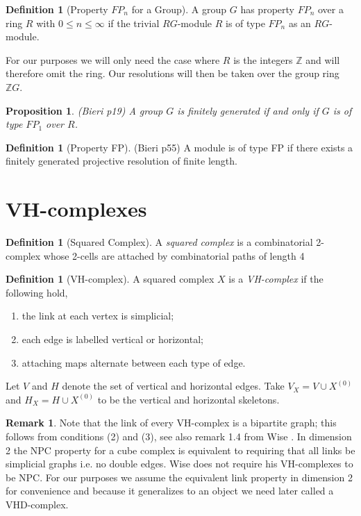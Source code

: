 \documentclass[12pt,parskip=full]{report}
\theoremstyle{plain}
\newtheorem{prop}[thm]{Proposition}
\theoremstyle{definition}
\newtheorem{rmk}[thm]{Remark}
\newtheorem{dfn}[thm]{Definition}
\begin{document}
\begin{dfn}
[Property \(FP_n\) for a Group]

A group \(G\) has property \(FP_n\) over a ring \(R\) with \(0\leq n\leq \infty\) if the trivial \(RG\)-module \(R\) is of type \(FP_n\) as an \(RG\)-module.
\end{dfn}

For our purposes we will only need the case where \(R\) is the integers \(\mathbb{Z}\) and will therefore omit the ring. Our resolutions will then be taken over the group ring \(\mathbb{Z}G\).

\begin{prop}
(Bieri p19)
A group \(G\) is finitely generated if and only if \(G\) is of type \(FP_1\) over \(R\).
\end{prop}

\begin{dfn}
[Property FP]
(Bieri p55)
A module is of type FP if there exists a finitely generated projective resolution of finite length.
\end{dfn}

\section{VH-complexes}

\begin{dfn}
    [Squared Complex]
    A \emph{squared complex} is a combinatorial 2-complex whose 2-cells are attached by combinatorial paths of length 4
\end{dfn}

\begin{dfn}
    [VH-complex]
    A squared complex $X$ is a \emph{VH-complex} if the following hold,
    \begin{enumerate}
        \item the link at each vertex is simplicial;
        \item each edge is labelled vertical or horizontal;
        \item attaching maps alternate between each type of edge.
    \end{enumerate}
    Let $V$ and $H$ denote the set of vertical and horizontal edges. Take $V_X = V \cup X^{(0)}$ and $H_X = H \cup X^{(0)}$ to be the vertical and horizontal skeletons. 
\end{dfn}

\begin{rmk}
Note that the link of every VH-complex is a bipartite graph; this follows from conditions (2) and (3), see also remark 1.4 from Wise \cite{wisethesis}. In dimension 2 the NPC property for a cube complex is equivalent to requiring that all links be simplicial graphs i.e. no double edges. Wise does not require his VH-complexes to be NPC. For our purposes we assume the equivalent link property in dimension 2 for convenience and because it generalizes to an object we need later called a VHD-complex.
\end{rmk}
\end{document}
